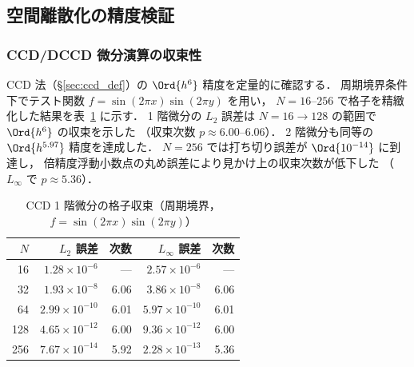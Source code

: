 %
\subsection{空間離散化の精度検証}
\label{sec:verify_spatial}

\subsubsection{CCD/DCCD 微分演算の収束性}
\label{sec:verify_ccd_convergence}

CCD 法（§\ref{sec:ccd_def}）の $\Ord{h^6}$ 精度を定量的に確認する．
周期境界条件下でテスト関数 $f = \sin(2\pi x)\sin(2\pi y)$ を用い，
$N = 16$--$256$ で格子を精緻化した結果を表~\ref{tab:ccd_periodic} に示す．
1 階微分の $L_2$ 誤差は $N = 16 \to 128$ の範囲で $\Ord{h^6}$ の収束を示した
（収束次数 $p \approx 6.00$--$6.06$）．
2 階微分も同等の $\Ord{h^{5.97}}$ 精度を達成した．
$N = 256$ では打ち切り誤差が $\Ord{10^{-14}}$ に到達し，
倍精度浮動小数点の丸め誤差により見かけ上の収束次数が低下した
（$L_\infty$ で $p \approx 5.36$）．

\begin{table}[htbp]
\centering
\caption{CCD 1 階微分の格子収束（周期境界，$f = \sin(2\pi x)\sin(2\pi y)$）}
\label{tab:ccd_periodic}
\begin{tabular}{rrrrr}
\toprule
$N$ & $L_2$ 誤差 & 次数 & $L_\infty$ 誤差 & 次数 \\
\midrule
 16 & $1.28 \times 10^{-6}$  & ---  & $2.57 \times 10^{-6}$  & ---  \\
 32 & $1.93 \times 10^{-8}$  & 6.06 & $3.86 \times 10^{-8}$  & 6.06 \\
 64 & $2.99 \times 10^{-10}$ & 6.01 & $5.97 \times 10^{-10}$ & 6.01 \\
128 & $4.65 \times 10^{-12}$ & 6.00 & $9.36 \times 10^{-12}$ & 6.00 \\
256 & $7.67 \times 10^{-14}$ & 5.92 & $2.28 \times 10^{-13}$ & 5.36 \\
\bottomrule
\end{tabular}
\end{table}

